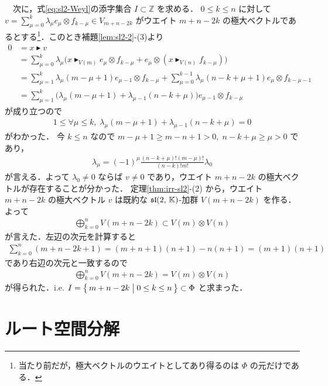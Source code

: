 \documentclass{ltjsarticle}
\theoremstyle{mystyle} %
\numberwithin{equation}{section}
\newcommand{\btr}{\blacktriangleright}
\begin{document}
　次に，式\eqref{eq:sl2-Weyl}の添字集合 $I \subset \mathbb{Z}$ を求める．
$0 \le k \le n$ に対して $v = \sum_{\mu=0}^k \lambda_\mu e_\mu \otimes f_{k - \mu} \in V_{m+n-2k}$ がウエイト $m+n-2k$ の極大ベクトルであるとする\footnote{当たり前だが，極大ベクトルのウエイトとしてあり得るのは $\Phi$ の元だけである．}．このとき補題\ref{lem:sl2-2}-(3)より
\begin{align}
    0 &= x \btr v \\
    &= \sum_{\mu=0}^k \lambda_\mu \bigl( x \btr_{V(m)} e_\mu \otimes f_{k-\mu} + e_\mu \otimes (x \btr_{V(n)} f_{k-\mu}) \bigr) \\
    &= \sum_{\mu=1}^k \lambda_\mu (m-\mu+1) e_{\mu-1} \otimes f_{k-\mu} + \sum_{\mu=0}^{k-1} \lambda_\mu (n-k+\mu+1) e_\mu \otimes f_{k-\mu-1} \\
    &= \sum_{\mu=1}^k \bigl( \lambda_\mu(m-\mu+1) + \lambda_{\mu-1}(n-k+\mu) \bigr) e_{\mu-1} \otimes f_{k-\mu}
\end{align}
が成り立つので
\begin{align}
    1 \le \forall \mu \le k,\; \lambda_\mu(m-\mu+1) + \lambda_{\mu-1}(n-k+\mu) = 0
\end{align}
がわかった．
今 $k \le n$ なので $m-\mu+1 \ge m-n+1 > 0,\; n-k+\mu \ge \mu > 0$ であり，
\begin{align}
    \lambda_\mu = (-1)^\mu \frac{(n-k+\mu)! (m-\mu)!}{(n-k)! m!} \lambda_0
\end{align}
が言える．よって $\lambda_0 \neq 0$ ならば $v \neq 0$ であり，ウエイト $m+n-2k$ の極大ベクトルが存在することが分かった．
定理\ref{thm:irr-sl2}-(2) から，ウエイト $m+n-2k$ の極大ベクトル $v$ は既約な $\mathfrak{sl}(2,\, \mathbb{K})$-加群 $V(m+n-2k)$ を作る．
よって
\begin{align}
    \bigoplus_{k=0}^n V(m+n-2k) \subset V(m) \otimes V(n)
\end{align}
が言えた．左辺の次元を計算すると
\begin{align}
    \sum_{k=0}^n (m+n-2k + 1) = (m+n+1)(n+1) - n(n+1) = (m+1)(n+1)
\end{align}
であり右辺の次元と一致するので
\begin{align}
    \bigoplus_{k=0}^n V(m+n-2k) = V(m) \otimes V(n)
\end{align}
が得られた．i.e. $I = \bigl\{\, m + n -2k \bigm| 0 \le k \le n \,\bigr\} \subset \Phi$ と求まった．

\section{ルート空間分解}
\end{document}
